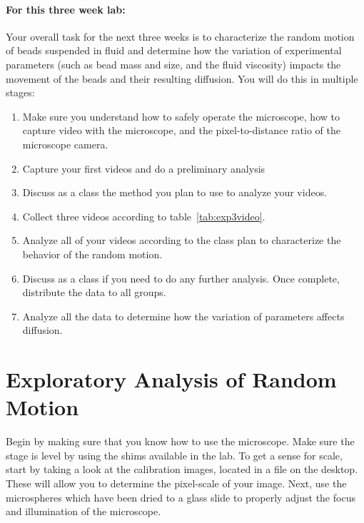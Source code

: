 \paragraph{For this three week lab:} Your overall task for the next three weeks is to characterize the random motion of beads suspended in fluid and determine how the variation of experimental parameters (such as bead mass and size, and the fluid viscosity) impacts the movement of the beads and their resulting diffusion.
You will do this in multiple stages:
\begin{enumerate}
\item Make sure you understand how to safely operate the microscope, how to capture video with the microscope, and the pixel-to-distance ratio of the microscope camera.
\item Capture your first videos and do a preliminary analysis
\item Discuss as a class the method you plan to use to analyze your videos.
\item Collect three videos according to table~\ref{tab:exp3video}.
\item Analyze all of your videos according to the class plan to characterize the behavior of the random motion.
\item Discuss as a class if you need to do any further analysis. Once complete, distribute the data to all groups.
\item Analyze all the data to determine how the variation of parameters affects diffusion.
\end{enumerate}

\section{Exploratory Analysis of Random Motion}
Begin by making sure that you know how to use the microscope.
Make sure the stage is level by using the shims available in the lab.
To get a sense for scale, start by taking a look at the calibration images, located in a file on the desktop.
These will allow you to determine the pixel-scale of your image.
Next, use the microspheres which have been dried to a glass slide to properly adjust the focus and illumination of the microscope.

